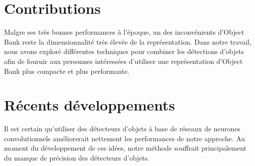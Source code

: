 \section{Contributions}

Malgre ses tr\`{e}s bonnes performances \`{a} l'\'{e}poque, un des
inconv\'{e}nients d'Object Bank reste la dimensionnalit\'{e} tr\`{e}s
\'{e}lev\'{e}e de la repr\'{e}sentation.  Dans notre travail, nous avons
explor\'{e} diff\'{e}rentes techniques pour combiner les d\'{e}tections
d'objets afin de fournir aux personnes int\'{e}ress\'{e}es d'utiliser une
repr\'{e}sentation d'Object Bank plus compacte et plus performante.


\section{R\'{e}cents d\'{e}veloppements}

Il est certain qu'utiliser des d\'{e}tecteurs d'objets \`{a} base de
r\'{e}seaux de neurones convolutionnels am\'{e}liorerait nettement les performances
de notre approche.  Au moment du d\'{e}veloppement de ces id\'{e}es, notre
m\'{e}thode souffrait principalement du manque de pr\'{e}cision des
d\'{e}tecteurs d'objets. 
